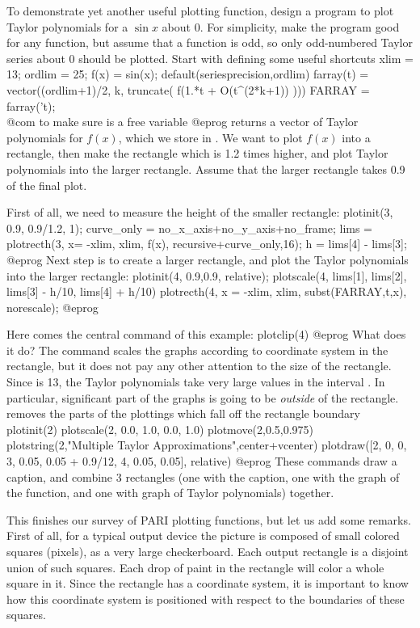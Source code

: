 To demonstrate yet another useful plotting function, design a program to
plot Taylor polynomials for a $\sin x$ about 0.  For simplicity, make the
program good for any function, but assume that a function is odd, so only
odd-numbered Taylor series about 0 should be plotted.  Start with defining
some useful shortcuts
\bprog
  xlim = 13;  ordlim = 25;  f(x) = sin(x);
  default(seriesprecision,ordlim)
  farray(t) = vector((ordlim+1)/2, k, truncate( f(1.*t + O(t^(2*k+1)) )))
  FARRAY = farray('t);  \\@com{} to make sure  is a free variable
@eprog\noindent
{} returns a vector of Taylor polynomials for $f(x)$, which we
store in .  We want to plot $f(x)$ into a rectangle, then make
the rectangle which is 1.2 times higher, and plot Taylor polynomials into the
larger rectangle.  Assume that the larger rectangle takes 0.9 of the final
plot.

First of all, we need to measure the height of the smaller rectangle:
\bprog
  plotinit(3, 0.9, 0.9/1.2, 1);
  curve_only = no_x_axis+no_y_axis+no_frame;
  lims = plotrecth(3, x= -xlim, xlim, f(x), recursive+curve_only,16);
  h = lims[4] - lims[3];
@eprog\noindent 
Next step is to create a larger rectangle, and plot the Taylor polynomials
into the larger rectangle:
\bprog
  plotinit(4, 0.9,0.9, relative);
  plotscale(4, lims[1], lims[2], lims[3] - h/10, lims[4] + h/10)
  plotrecth(4, x = -xlim, xlim, subst(FARRAY,t,x), norescale);
@eprog

Here comes the central command of this example:
\bprog
  plotclip(4)
@eprog\noindent
What does it do?  The command  scales the
graphs according to coordinate system in the rectangle, but it does not pay
any other attention to the size of the rectangle.  Since  is 13,
the Taylor polynomials take very large values in the interval
.  In particular, significant part of the graphs is going
to be \emph{outside} of the rectangle.  removes the parts of
the plottings which fall off the rectangle boundary
\bprog
  plotinit(2)
  plotscale(2, 0.0, 1.0, 0.0, 1.0)
  plotmove(2,0.5,0.975)
  plotstring(2,"Multiple Taylor Approximations",center+vcenter)
  plotdraw([2, 0, 0,  3, 0.05, 0.05 + 0.9/12,  4, 0.05, 0.05], relative)
@eprog\noindent
These commands draw a caption, and combine 3 rectangles (one with the
caption, one with the graph of the function, and one with graph of Taylor
polynomials) together.

This finishes our survey of PARI plotting functions, but let us add
some remarks.  First of all, for a typical output device the picture is
composed of small colored squares (pixels), as a very large checkerboard.
Each output rectangle is a disjoint union of such squares.  Each drop
of paint in the rectangle will color a whole square in it.  Since the
rectangle has a coordinate system, it is important to know how this
coordinate system is positioned with respect to the boundaries of these
squares.

